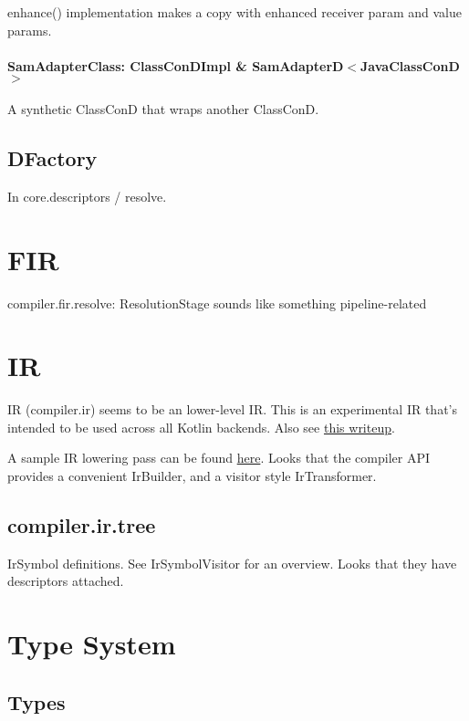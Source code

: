 \documentclass{article}
\begin{document}
enhance() implementation makes a copy with enhanced receiver param and value params.

\paragraph{SamAdapterClass: ClassConDImpl \& SamAdapterD$<$JavaClassConD$>$}
A synthetic ClassConD that wraps another ClassConD.

\subsection{DFactory}

In core.descriptors / resolve.

\section{FIR}
\label{sec:fir}

compiler.fir.resolve: ResolutionStage sounds like something pipeline-related

\section{IR}
\label{sec:ir}

IR (compiler.ir) seems to be an lower-level IR. This is an experimental IR that's intended to be used across all Kotlin backends. Also see \href{https://medium.com/@bnorm/exploring-kotlin-ir-bed8df167c23}{this writeup}.

A sample IR lowering pass can be found \href{https://github.com/JetBrains/kotlin/blob/936e53d/compiler/ir/backend.common/src/org/jetbrains/kotlin/backend/common/lower/TailrecLowering.kt}{here}. Looks that the compiler API provides a convenient IrBuilder, and a visitor style IrTransformer.

\subsection{compiler.ir.tree}

IrSymbol definitions. See IrSymbolVisitor for an overview. Looks that they have descriptors attached.

\section{Type System}

\subsection{Types}
\end{document}
